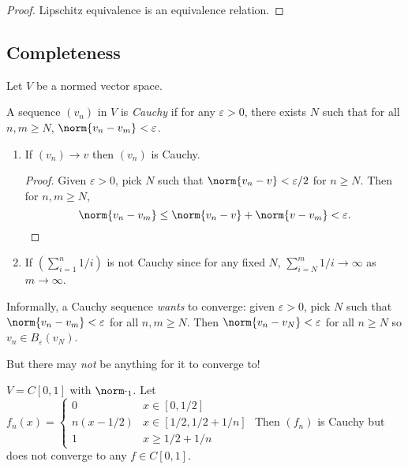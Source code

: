 \documentclass[a4paper]{article}
\theoremstyle{definition}
\begin{document}
\begin{proof}
  Lipschitz equivalence is an equivalence relation.
\end{proof}

\subsection{Completeness}

Let \(V\) be a normed vector space.

\begin{definition}
  A sequence \((v_n)\) in \(V\) is \emph{Cauchy} if for any \(\varepsilon>0\), there exists \(N\) such that for all \(n,m\geq N\), \(\norm{v_n-v_m} < \varepsilon\).
\end{definition}

\begin{eg}\leavevmode
  \begin{enumerate}
  \item If \((v_n)\to v\) then \((v_n)\) is Cauchy.
    \begin{proof}
      Given \(\varepsilon>0\), pick \(N\) such that \(\norm{v_n-v} < \varepsilon/2\) for \(n\geq N\). Then for \(n,m \geq N\),
      \[
        \norm{v_n-v_m} \leq \norm{v_n-v}+ \norm{v-v_m} < \varepsilon.
      \]
    \end{proof}
  \item If \((\sum_{i=1}^{n}1/i )\) is not Cauchy since for any fixed \(N\), \(\sum_{i=N}^{m}1/i \to \infty \) as \(m\to \infty\).
  \end{enumerate}
\end{eg}

Informally, a Cauchy sequence \emph{wants} to converge: given \(\varepsilon>0\), pick \(N\) such that \(\norm{v_n-v_m}< \varepsilon\) for all \(n,m\geq N\). Then \(\norm{v_n-v_N} < \varepsilon\) for all \(n\geq N\) so \(v_n \in B_\varepsilon(v_N)\).

But there may \emph{not} be anything for it to converge to!

\begin{eg}
  \(V = C[0,1]\) with \(\norm \cdot_1\). Let \(f_n(x) =
  \begin{cases}
    0 & x \in [0,1/2] \\
    n(x-1/2) & x \in [1/2,1/2+1/n] \\
    1 & x \geq 1/2+1/n
  \end{cases}
  \) Then \((f_n)\) is Cauchy but does not converge to any \(f\in C[0,1]\).
\end{eg}
\end{document}
